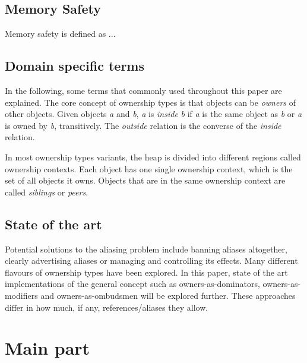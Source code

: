 \documentclass[sigplan,11pt,nonacm]{acmart}
\begin{document}
\subsection{Memory Safety}


Memory safety is defined as ...

\subsection{Domain specific terms}

In the following, some terms that commonly used throughout this paper are explained.
The core concept of ownership types is that objects can be \emph{owners} of other objects.
Given objects \emph{a} and \emph{b}, \emph{a} is \emph{inside} \emph{b} if \emph{a} is the same object as \emph{b} or \emph{a} is owned by \emph{b}, transitively.
The \emph{outside} relation is the converse of the \emph{inside} relation.

In most ownership types variants, the heap is divided into different regions called ownership contexts.
Each object has one single ownership context, which is the set of all objects it owns.
Objects that are in the same ownership context are called \emph{siblings} or \emph{peers}.
\cite{ownership-types-survey}

\subsection{State of the art}



Potential solutions to the aliasing problem include banning aliases altogether, clearly advertising aliases or managing and controlling its effects\cite{ownership-types-survey}.
Many different flavours of ownership types have been explored.
In this paper, state of the art implementations of the general concept such as owners-as-dominators, owners-as-modifiers and owners-as-ombudsmen will be explored further.
These approaches differ in how much, if any, references/aliases they allow.


\section{Main part}
\label{sec:mainpart}
\end{document}
